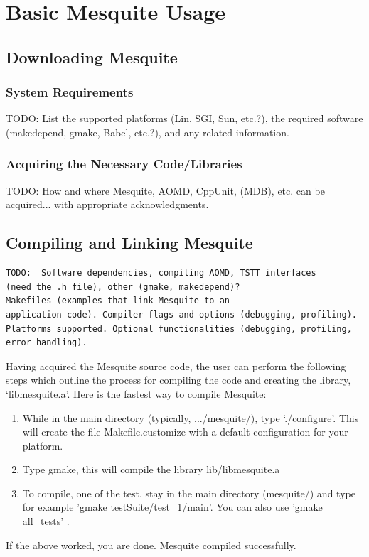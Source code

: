 \documentclass[letter]{report}
\begin{document}
\chapter{Basic Mesquite Usage}

\section{Downloading Mesquite}

\subsection{System Requirements}
TODO:  List the supported platforms (Lin, SGI, Sun, etc.?), the required
software (makedepend, gmake, Babel, etc.?), and any related information.
\subsection{Acquiring the Necessary Code/Libraries}
TODO:  How and where Mesquite, AOMD, CppUnit, (MDB), etc. can be
acquired... with appropriate acknowledgments.

\section{Compiling and Linking Mesquite}
\label{sec:compiling}
\begin{verbatim}
TODO:  Software dependencies, compiling AOMD, TSTT interfaces
(need the .h file), other (gmake, makedepend)?  
Makefiles (examples that link Mesquite to an 
application code). Compiler flags and options (debugging, profiling). 
Platforms supported. Optional functionalities (debugging, profiling, 
error handling).
\end{verbatim}

Having acquired the Mesquite source code, the user can perform the
following steps which outline the process for compiling the code and
creating the library, `libmesquite.a'. Here is the fastest way to compile Mesquite:
\begin{enumerate}
\item While in the main directory (typically, .../mesquite/), type
`./configure'.  This will create the file Makefile.customize with a default configuration
for your platform.
\item Type gmake, this will compile the library lib/libmesquite.a
\item To compile, one of the test, stay in the main directory (mesquite/) and type 
for example 'gmake testSuite/test\_1/main'. You can also use 'gmake all\_tests' .
\end{enumerate}
If the above worked, you are done. Mesquite compiled successfully. 
\end{document}
